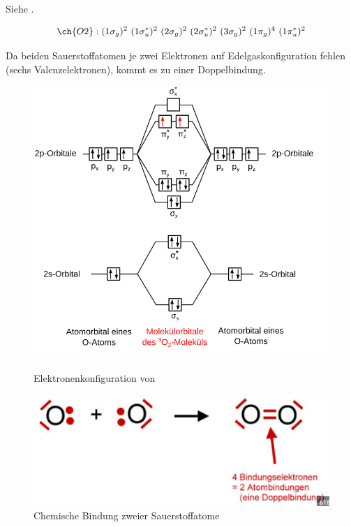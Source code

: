 Siehe .

\label{q:69}

\[\ch{O2} : (1\sigma_g)^2 ~ (1\sigma_u^*)^2 ~ (2\sigma_g)^2 ~ (2\sigma_u^*)^2 ~ (3\sigma_g)^2 ~ (1\pi_g)^4 ~ (1\pi_u^*)^2\]

Da beiden Sauerstoffatomen je zwei Elektronen auf Edelgaskonfiguration fehlen (sechs Valenzelektronen), kommt es zu einer Doppelbindung.

\setcapindent{0pt}
\begin{figure}[H]
   \centering
   \begin{minipage}[t]{0.475\linewidth}
      \centering
      \includegraphics[width=\linewidth]{resources/28-11-2018/O2.PNG}
      \caption{Elektronenkonfiguration von }
      \label{fig:Elektronenkonfiguration_O2}
   \end{minipage}%
   \hspace*{\fill}
   \begin{minipage}[t]{0.475\linewidth}
      \centering
      \includegraphics[width=\linewidth]{resources/28-11-2018/o2_bindung.PNG}
      \caption{Chemische Bindung zweier Sauerstoffatome}
      \label{fig:chemische_Bindung_O2}
   \end{minipage}
\end{figure}
\setcaphanging

\newpage